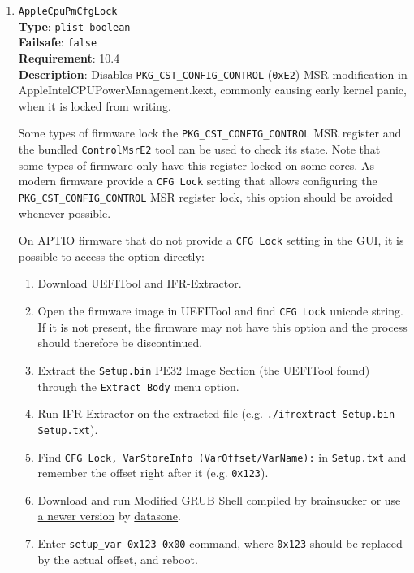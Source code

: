 \documentclass[]{article}
\providecommand{\tightlist}{%
  \setlength{\itemsep}{0pt}\setlength{\parskip}{0pt}}
\begin{document}
\begin{enumerate}

\item
  \texttt{AppleCpuPmCfgLock}\\
  \textbf{Type}: \texttt{plist\ boolean}\\
  \textbf{Failsafe}: \texttt{false}\\
  \textbf{Requirement}: 10.4\\
  \textbf{Description}: Disables \texttt{PKG\_CST\_CONFIG\_CONTROL} (\texttt{0xE2})
  MSR modification in AppleIntelCPUPowerManagement.kext, commonly causing early
  kernel panic, when it is locked from writing.

  Some types of firmware lock the \texttt{PKG\_CST\_CONFIG\_CONTROL} MSR
  register and the bundled \texttt{ControlMsrE2} tool can be used to check its
  state. Note that some types of firmware only have this register locked on some
  cores. As modern firmware provide a \texttt{CFG Lock} setting that allows
  configuring the \texttt{PKG\_CST\_CONFIG\_CONTROL} MSR register lock, this
  option should be avoided whenever possible.

  On APTIO firmware that do not provide a \texttt{CFG Lock}
  setting in the GUI, it is possible to access the option directly:

  \begin{enumerate}
    \tightlist
    \item Download \href{https://github.com/LongSoft/UEFITool/releases}{UEFITool} and
      \href{https://github.com/LongSoft/Universal-IFR-Extractor/releases}{IFR-Extractor}.
    \item Open the firmware image in UEFITool and find \texttt{CFG Lock} unicode string.
      If it is not present, the firmware may not have this option and the process should therefore be discontinued.
    \item Extract the \texttt{Setup.bin} PE32 Image Section (the UEFITool found) through the
      \texttt{Extract Body} menu option.
    \item Run IFR-Extractor on the extracted file (e.g. \texttt{./ifrextract Setup.bin Setup.txt}).
    \item Find \texttt{CFG Lock, VarStoreInfo (VarOffset/VarName):} in \texttt{Setup.txt} and
      remember the offset right after it (e.g. \texttt{0x123}).
    \item Download and run \href{http://brains.by/posts/bootx64.7z}{Modified GRUB Shell} compiled by
      \href{https://geektimes.com/post/258090}{brainsucker} or use
      \href{https://github.com/datasone/grub-mod-setup_var}{a newer version} by
      \href{https://github.com/datasone}{datasone}.
    \item Enter \texttt{setup\_var 0x123 0x00} command, where \texttt{0x123} should be replaced by
      the actual offset, and reboot.
  \end{enumerate}


\end{enumerate}
\end{document}
